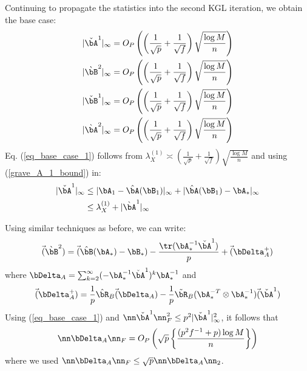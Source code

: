 \begin{IEEEproof}
Continuing to propagate the statistics into the second KGL iteration, we obtain the base case:
\begin{align}
	|\check{\bA}^1|_\infty &= O_P\left( \left( \frac{1}{\sqrt{p}} + \frac{1}{\sqrt{f}} \right) \sqrt{\frac{\log M}{n}} \right) \label{eq_base_case_1} \\
	|\grave{\bB}^2|_\infty &= O_P\left( \left( \frac{1}{\sqrt{p}} + \frac{1}{\sqrt{f}} \right) \sqrt{\frac{\log M}{n}} \right) \label{eq_base_case_2} \\
	|\check{\bB}^1|_\infty &= O_P\left( \left( \frac{1}{\sqrt{p}} + \frac{1}{\sqrt{f}} \right) \sqrt{\frac{\log M}{n}} \right) \label{eq_base_case_3} \\
	|\grave{\bA}^2|_\infty &= O_P\left( \left( \frac{1}{\sqrt{p}} + \frac{1}{\sqrt{f}} \right) \sqrt{\frac{\log M}{n}} \right) \label{eq_base_case_4}
\end{align}
Eq. (\ref{eq_base_case_1}) follows from $\lambda_X^{(1)}\asymp \left( \frac{1}{\sqrt{p}} + \frac{1}{\sqrt{f}} \right) \sqrt{\frac{\log M}{n}}$ and using (\ref{grave_A_1_bound}) in:
\begin{align*}
	|\check{\bA}^1|_\infty &\leq |\bA_1 - \hat{\bA}(\bB_1)|_\infty + |\hat{\bA}(\bB_1)-\bA_*|_\infty \\
		&\leq \lambda_X^{(1)} + |\grave{\bA}^1|_\infty
\end{align*}

Using similar techniques as before, we can write:
\begin{equation}
	\vec(\grave{\bB}^2) = \vec(\hat{\bB}(\bA_*)-\bB_*) - \frac{\tr(\bA_*^{-1} \check{\bA}^1)}{p} + \vec(\bDelta_A^+) \label{grave_B_2}
\end{equation}
where $\bDelta_A = \sum_{k=2}^\infty (-\bA_*^{-1}\check{\bA}^1)^k \bA_*^{-1}$ and
\begin{equation*}
	\vec(\bDelta_A^+) = \frac{1}{p}\hat{\bR}_B \vec(\bDelta_A) - \frac{1}{p}\tilde{\bR}_B(\bA_*^{-T}\otimes \bA_*^{-1}) \vec(\check{\bA}^1)
\end{equation*}
Using (\ref{eq_base_case_1}) and $\nn \check{\bA}^1 \nn_F^2 \leq p^2 |\check{\bA}^1|_\infty^2$, it follows that
\begin{equation} \label{bound_Delta_A_Frob}
	\nn \bDelta_A \nn_F = O_P\left(\sqrt{p} \left\{ \frac{(p^2 f^{-1}+p) \log M}{n} \right\} \right)
\end{equation}
where we used $\nn \bDelta_A \nn_F \leq \sqrt{p} \nn\bDelta_A \nn_2$.


\end{IEEEproof}

